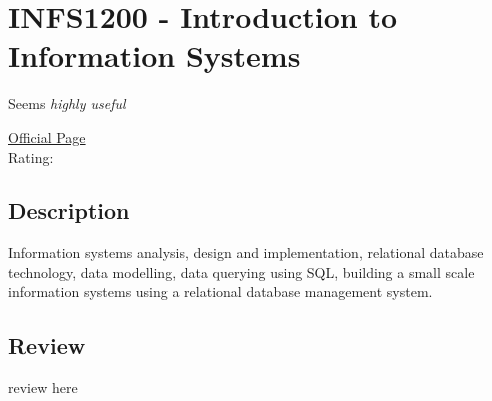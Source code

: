 \hypertarget{INFS1200}{\section{INFS1200 - Introduction to Information Systems}}
Seems \textit{highly useful}

\large
\textcolor{turbo_purple}{\href{https://my.uq.edu.au/programs-courses/course.html?course_code=INFS1200}{Official Page}} \\
Rating: \cstar\cstar\cstar\cstar\ostar

\normalsize
\subsection*{Description}
Information systems analysis, design and implementation, relational database technology, data modelling, data querying using SQL, building a small scale information systems using a relational database management system.

\subsection*{Review}
review here
